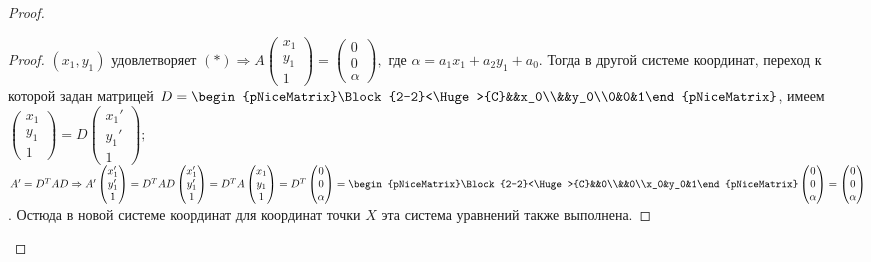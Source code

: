 \documentclass[a4paper, 12pt]{article}
\theoremstyle{definition}
\begin{document}
\begin{proof}
\begin{proof}
			$(x_1, y_1)$ удовлетворяет $(*) \Rightarrow A \begin{pmatrix} x_1  \\ y_1 \\ 1 \end{pmatrix} = \begin{pmatrix} 0  \\ 0 \\ \alpha \end{pmatrix},$ где $\alpha = a_1x_1 + a_2y_1 + a_0$. Тогда в другой системе координат, переход к которой задан матрицей $D = \begin{pNiceMatrix}\Block{2-2}<\Huge>{C}&&x_0\\&&y_0\\0&0&1\end{pNiceMatrix}$, имеем $\begin{pmatrix} x_1\\y_1\\1\end{pmatrix} = D\begin{pmatrix} x_1'\\y_1'\\1\end{pmatrix};$ $A' = D^TAD \Rightarrow A'\begin{pmatrix} x_1'\\y_1'\\1\end{pmatrix} = D^TAD\begin{pmatrix} x_1'\\y_1'\\1\end{pmatrix} = D^TA\begin{pmatrix} x_1\\y_1\\1\end{pmatrix} = D^T\begin{pmatrix} 0\\0\\\alpha\end{pmatrix} = \begin{pNiceMatrix}\Block{2-2}<\Huge>{C}&&0\\&&0\\x_0&y_0&1\end{pNiceMatrix}\begin{pmatrix} 0\\0\\\alpha\end{pmatrix} = \begin{pmatrix} 0\\0\\\alpha\end{pmatrix}$. Остюда в новой системе координат для координат точки $X$ эта система уравнений также выполнена.

\end{proof}
\end{proof}
\end{document}
